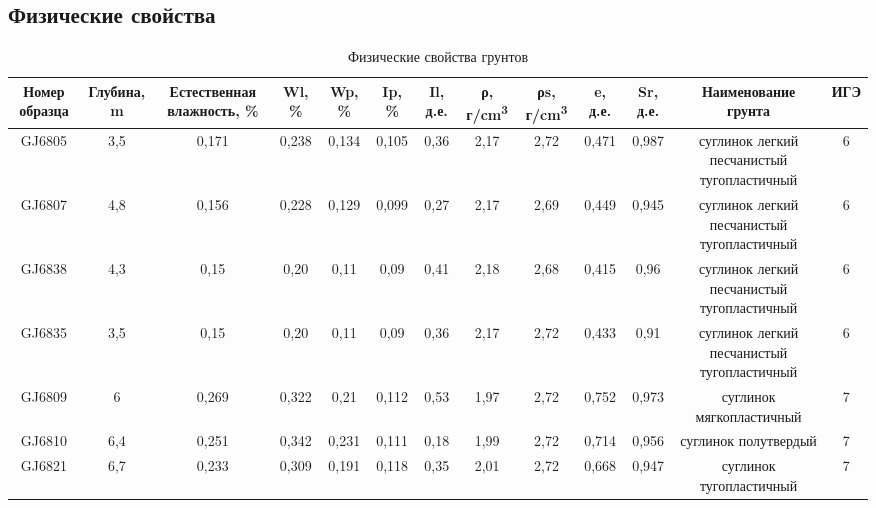 \begin{landscape}

\chapter{Физические свойства}\label{app:phisics}

\begin{sidewaystable}[]
    \centering
    \small
    \caption{Физические свойства грунтов}
    \begin{tabular}{|c|c|c|c|c|c|c|c|c|c|c|c|c|}
    \hline
    Номер   образца & Глубина, \si{\meter} & Естественная   влажность, \% & Wl, \% & Wp, \% & Ip, \% & Il, д.е. & ρ, г/\si{\centi\meter^3} & ρs, г/\si{\centi\meter^3} & e, д.е. & Sr, д.е. & Наименование   грунта                        & ИГЭ \\ \hline
    GJ6805          & 3,5        & 0,171                        & 0,238  & 0,134  & 0,105  & 0,36     & 2,17     & 2,72      & 0,471   & 0,987    & суглинок легкий   песчанистый тугопластичный & 6   \\ \hline
    GJ6807          & 4,8        & 0,156                        & 0,228  & 0,129  & 0,099  & 0,27     & 2,17     & 2,69      & 0,449   & 0,945    & суглинок легкий   песчанистый тугопластичный & 6   \\ \hline
    GJ6838          & 4,3        & 0,15                         & 0,20   & 0,11   & 0,09   & 0,41     & 2,18     & 2,68      & 0,415   & 0,96     & суглинок легкий   песчанистый тугопластичный & 6   \\ \hline
    GJ6835          & 3,5        & 0,15                         & 0,20   & 0,11   & 0,09   & 0,36     & 2,17     & 2,72      & 0,433   & 0,91     & суглинок легкий   песчанистый тугопластичный & 6   \\ \hline
    GJ6809          & 6          & 0,269                        & 0,322  & 0,21   & 0,112  & 0,53     & 1,97     & 2,72      & 0,752   & 0,973    & суглинок   мягкопластичный                   & 7   \\ \hline
    GJ6810          & 6,4        & 0,251                        & 0,342  & 0,231  & 0,111  & 0,18     & 1,99     & 2,72      & 0,714   & 0,956    & суглинок полутвердый                         & 7   \\ \hline
    GJ6821          & 6,7        & 0,233                        & 0,309  & 0,191  & 0,118  & 0,35     & 2,01     & 2,72      & 0,668   & 0,947    & суглинок   тугопластичный                    & 7   \\ \hline

\end{tabular}
\end{sidewaystable}
\end{landscape}
